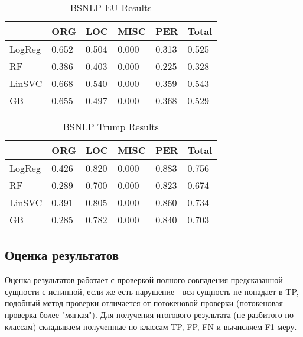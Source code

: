 \begin{table}[ht]
\centering
\caption{BSNLP EU Results}
\label{bsnlp_eu}
\begin{tabular}{|l|l|l|l|l|l|}
\hline
            & ORG   & LOC   & MISC  & PER   & Total \\ \hline
LogReg      & 0.652 & 0.504 & 0.000 & 0.313 & 0.525 \\ \hline
RF          & 0.386 & 0.403 & 0.000 & 0.225 & 0.328 \\ \hline
LinSVC      & 0.668 & 0.540 & 0.000 & 0.359 & 0.543 \\ \hline
GB          & 0.655 & 0.497 & 0.000 & 0.368 & 0.529 \\ \hline
\end{tabular}
\end{table}



\begin{table}[ht]
\centering
\caption{BSNLP Trump Results}
\label{bsnlp_trump}
\begin{tabular}{|l|l|l|l|l|l|}
\hline
            & ORG   & LOC   & MISC  & PER   & Total \\ \hline
LogReg      & 0.426 & 0.820 & 0.000 & 0.883 & 0.756 \\ \hline
RF          & 0.289 & 0.700 & 0.000 & 0.823 & 0.674 \\ \hline
LinSVC      & 0.391 & 0.805 & 0.000 & 0.860 & 0.734 \\ \hline
GB          & 0.285 & 0.782 & 0.000 & 0.840 & 0.703 \\ \hline
\end{tabular}
\end{table}

\subsection{Оценка результатов}

Оценка результатов работает с проверкой полного совпадения предсказанной сущности с истинной, если же есть нарушение - вся сущность не попадает в TP, подобный метод проверки отличается от потокеновой проверки (потокеновая проверка более "мягкая"). Для получения итогового результата (не разбитого по классам) складываем полученные по классам TP, FP, FN и вычисляем F1 меру.